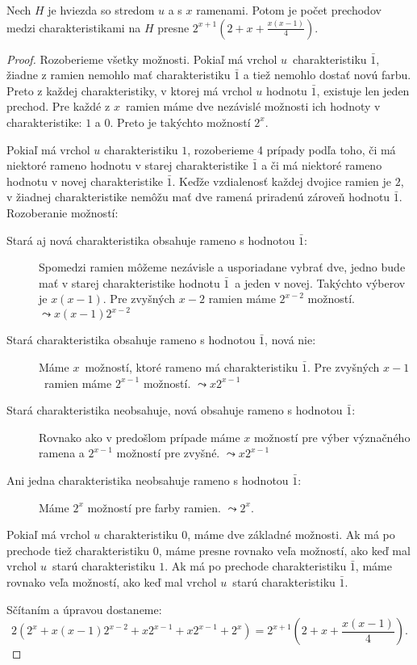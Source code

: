 \begin{lema}
    Nech $H$ je hviezda so stredom $u$ a s $x$ ramenami. Potom je počet prechodov medzi charakteristikami
    na $H$ presne $2^{x+1}\left(2 + x + \frac{x(x-1)}{4}\right)$.
\end{lema}
\begin{proof}
    Rozoberieme všetky možnosti. Pokiaľ má vrchol $u$ charakteristiku $\bar{1}$, žiadne z ramien nemohlo
    mať charakteristiku $\bar{1}$ a tiež nemohlo dostať novú farbu. Preto z každej charakteristiky, v ktorej
    má vrchol $u$ hodnotu $\bar{1}$, existuje len jeden prechod. Pre každé z $x$ ramien máme dve nezávislé
    možnosti ich hodnoty v charakteristike: $1$ a $0$. Preto je takýchto možností $2^x$.

    Pokiaľ má vrchol $u$ charakteristiku $1$, rozoberieme 4 prípady podľa toho, či má niektoré rameno
    hodnotu v starej charakteristike $\bar{1}$ a či má niektoré rameno hodnotu v novej charakteristike $\bar{1}$.
    Keďže vzdialenosť každej dvojice ramien je $2$, v žiadnej charakteristike nemôžu mať dve ramená priradenú
    zároveň hodnotu $\bar{1}$. Rozoberanie možností:

    \begin{description}
        \item[Stará aj nová charakteristika obsahuje rameno s hodnotou $\bar{1}$:] Spomedzi ramien môžeme
        nezávisle a usporiadane vybrať dve, jedno bude mať v starej charakteristike hodnotu $\bar{1}$ a jeden
        v novej. Takýchto výberov je $x(x-1)$. Pre zvyšných $x-2$ ramien máme $2^{x-2}$ možností. $\leadsto x(x-1)2^{x-2}$
        \item[Stará charakteristika obsahuje rameno s hodnotou $\bar{1}$, nová nie:] Máme $x$ možností, ktoré
        rameno má charakteristiku $\bar{1}$. Pre zvyšných $x-1$ ramien máme $2^{x-1}$ možností. $\leadsto x2^{x-1}$
        \item[Stará charakteristika neobsahuje, nová obsahuje rameno s hodnotou $\bar{1}$:] Rovnako ako v
        predošlom prípade máme $x$ možností pre výber význačného ramena a $2^{x-1}$ možností pre zvyšné. $\leadsto x2^{x-1}$
        \item[Ani jedna charakteristika neobsahuje rameno s hodnotou $\bar{1}$:] Máme $2^x$ možností pre farby
        ramien. $\leadsto 2^x$.
    \end{description}

    Pokiaľ má vrchol $u$ charakteristiku $0$, máme dve základné možnosti. Ak má po prechode tiež charakteristiku $0$,
    máme presne rovnako veľa možností, ako keď mal vrchol $u$ starú charakteristiku $1$. Ak má po prechode
    charakteristiku $\bar{1}$, máme rovnako veľa možností, ako keď mal vrchol $u$ starú charakteristiku $\bar{1}$.

    Sčítaním a úpravou dostaneme:
    $$2(2^x + x(x-1)2^{x-2} + x2^{x-1} + x2^{x-1} + 2^x) = 2^{x+1}\left(2 + x + \frac{x(x-1)}{4}\right).$$
\end{proof}
